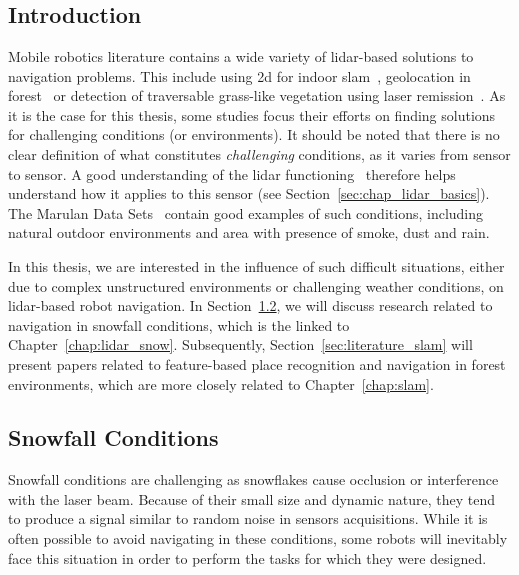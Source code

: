 \chapter{\chapzerotitle}
\label{chap:literature_review}


\section{Introduction}

Mobile robotics literature contains a wide variety of \gls*{lidar}-based solutions to navigation problems. This include using \gls*{2d} for indoor \gls*{slam}~\citep{Grisetti2007, Kohlbrecher2011}, geolocation in forest~\citep{Hussein2015} or detection of traversable grass-like vegetation using laser remission~\citep{Wurm2009}. As it is the case for this thesis, some studies focus their efforts on finding solutions for challenging conditions (or environments). It should be noted that there is no clear definition of what constitutes \emph{challenging} conditions, as it varies from sensor to sensor. A good understanding of the \gls*{lidar} functioning~\citep{Bosch2001} therefore helps understand how it applies to this sensor (see Section~\ref{sec:chap_lidar_basics}). The Marulan Data Sets~\citep{Peynot2010} contain good examples of such conditions, including natural outdoor environments and area with presence of smoke, dust and rain.

In this thesis, we are interested in the influence of such difficult situations, either due to complex unstructured environments or challenging weather conditions, on \gls*{lidar}-based robot navigation. In Section~\ref{sec:literature_snow}, we will discuss research related to navigation in snowfall conditions, which is the linked to Chapter~\ref{chap:lidar_snow}. Subsequently, Section~\ref{sec:literature_slam} will present papers related to feature-based place recognition and navigation in forest environments, which are more closely related to Chapter~\ref{chap:slam}. 


\section{Snowfall Conditions}
\label{sec:literature_snow}

Snowfall conditions are challenging as snowflakes cause occlusion or interference with the laser beam. Because of their small size and dynamic nature, they tend to produce a signal similar to random noise in sensors acquisitions. While it is often possible to avoid navigating in these conditions, some robots will inevitably face this situation in order to perform the tasks for which they were designed. 

